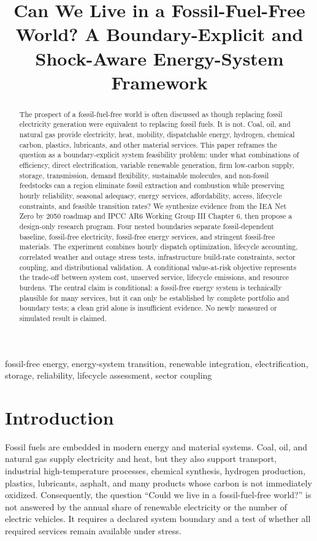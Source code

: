 \documentclass[conference]{IEEEtran}
\title{Can We Live in a Fossil-Fuel-Free World? A Boundary-Explicit and Shock-Aware Energy-System Framework}
\author{\IEEEauthorblockN{Research Design Report}\IEEEauthorblockA{Four-Agent Scientific Workflow: Survey--Idea--ExperimentDesign--Author}}
\begin{document}
\maketitle
\begin{abstract}
The prospect of a fossil-fuel-free world is often discussed as though replacing fossil electricity generation were equivalent to replacing fossil fuels. It is not. Coal, oil, and natural gas provide electricity, heat, mobility, dispatchable energy, hydrogen, chemical carbon, plastics, lubricants, and other material services. This paper reframes the question as a boundary-explicit system feasibility problem: under what combinations of efficiency, direct electrification, variable renewable generation, firm low-carbon supply, storage, transmission, demand flexibility, sustainable molecules, and non-fossil feedstocks can a region eliminate fossil extraction and combustion while preserving hourly reliability, seasonal adequacy, energy services, affordability, access, lifecycle constraints, and feasible transition rates? We synthesize evidence from the IEA Net Zero by 2050 roadmap and IPCC AR6 Working Group III Chapter 6, then propose a design-only research program. Four nested boundaries separate fossil-dependent baseline, fossil-free electricity, fossil-free energy services, and stringent fossil-free materials. The experiment combines hourly dispatch optimization, lifecycle accounting, correlated weather and outage stress tests, infrastructure build-rate constraints, sector coupling, and distributional validation. A conditional value-at-risk objective represents the trade-off between system cost, unserved service, lifecycle emissions, and resource burdens. The central claim is conditional: a fossil-free energy system is technically plausible for many services, but it can only be established by complete portfolio and boundary tests; a clean grid alone is insufficient evidence. No newly measured or simulated result is claimed.
\end{abstract}
\begin{IEEEkeywords}
fossil-free energy, energy-system transition, renewable integration, electrification, storage, reliability, lifecycle assessment, sector coupling
\end{IEEEkeywords}

\section{Introduction}
\label{sec:intro}
Fossil fuels are embedded in modern energy and material systems. Coal, oil, and natural gas supply electricity and heat, but they also support transport, industrial high-temperature processes, chemical synthesis, hydrogen production, plastics, lubricants, asphalt, and many products whose carbon is not immediately oxidized. Consequently, the question ``Could we live in a fossil-fuel-free world?'' is not answered by the annual share of renewable electricity or the number of electric vehicles. It requires a declared system boundary and a test of whether all required services remain available under stress.
\end{document}
